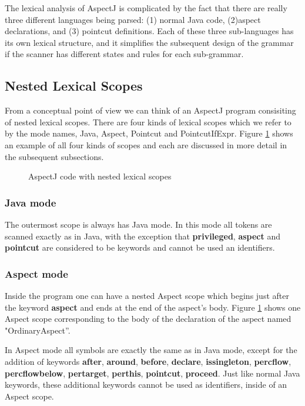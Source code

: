 The lexical analysis of AspectJ is complicated by the fact that there are
really three different languages being parsed: (1) normal Java code,
(2)aspect declarations, and 
(3) pointcut definitions.
Each of these three sub-languages has its own lexical structure,  and it 
simplifies the subsequent design of the grammar if the scanner has different 
states and rules for each sub-grammar.

\subsection{Nested Lexical Scopes}
From a conceptual point of view we can think of an AspectJ program 
consisiting of nested lexical scopes.   There are four kinds of lexical
scopes which we refer to by the mode names, {\sc Java}, {\sc Aspect},
{\sc Pointcut} and {\sc PointcutIfExpr}.   
Figure \ref{FIG:LexExample} shows an example of all four kinds of scopes
and each are discussed in more detail in the subsequent subsections.   

\begin{figure}[htbp]

\caption{AspectJ code with nested lexical scopes \label{FIG:LexExample}}
\end{figure}

\subsubsection{{\sc Java} mode}
The outermost scope is always has
{\sc Java} mode.  In this mode all tokens are scanned exactly as in
Java, with the exception that {\bf privileged},  {\bf aspect} and 
{\bf pointcut} are considered to be keywords and cannot be used an identifiers.

\subsubsection{{\sc Aspect} mode}
Inside the program one can have a nested {\sc Aspect} scope which begins
just after the keyword {\bf aspect} and ends at the end of the aspect's body.
Figure \ref{FIG:LexExample} shows one  {\sc Aspect} scope corresponding
to the body of the declaration of the aspect named "OrdinaryAspect''. 

In {\sc Aspect} mode all symbols are exactly
the same as in {\sc Java} mode,  except for the addition of  keywords
{\bf after}, {\bf around}, {\bf before}, {\bf declare}, 
{\bf issingleton}, {\bf percflow}, {\bf percflowbelow}, {\bf pertarget},
{\bf perthis}, {\bf pointcut}, {\bf proceed}. 
Just like normal Java keywords, these
additional keywords cannot be used as identifiers, inside of an
{\sc Aspect} scope.

